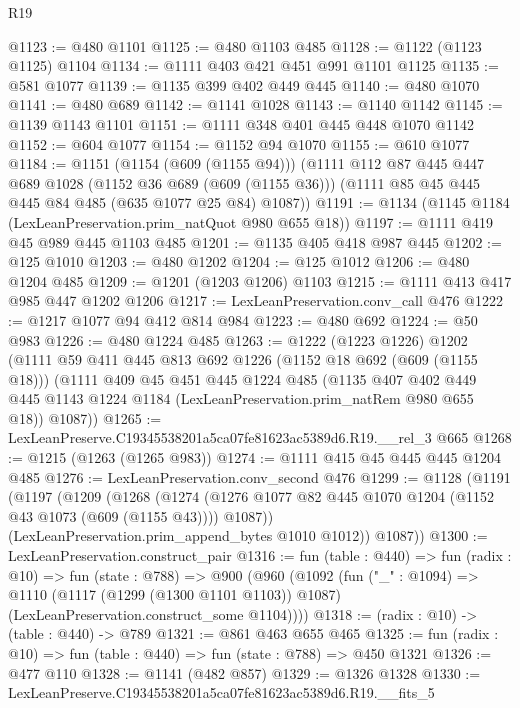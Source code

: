 \begin{lexlean}{R19}
\begin{coremodule}
@1123 := @480 @1101
@1125 := @480 @1103 @485
@1128 := @1122 (@1123 @1125) @1104
@1134 := @1111 @403 @421 @451 @991 @1101 @1125
@1135 := @581 @1077
@1139 := @1135 @399 @402 @449 @445
@1140 := @480 @1070
@1141 := @480 @689
@1142 := @1141 @1028
@1143 := @1140 @1142
@1145 := @1139 @1143 @1101
@1151 := @1111 @348 @401 @445 @448 @1070 @1142
@1152 := @604 @1077
@1154 := @1152 @94 @1070
@1155 := @610 @1077
@1184 := @1151
    (@1154 (@609 (@1155 @94)))
    (@1111
      @112
      @87
      @445
      @447
      @689
      @1028
      (@1152 @36 @689 (@609 (@1155 @36)))
      (@1111 @85 @45 @445 @445 @84 @485 (@635 @1077 @25 @84) @1087))
@1191 := @1134 (@1145 @1184 (LexLeanPreservation.prim_natQuot @980 @655 @18))
@1197 := @1111 @419 @45 @989 @445 @1103 @485
@1201 := @1135 @405 @418 @987 @445
@1202 := @125 @1010
@1203 := @480 @1202
@1204 := @125 @1012
@1206 := @480 @1204 @485
@1209 := @1201 (@1203 @1206) @1103
@1215 := @1111 @413 @417 @985 @447 @1202 @1206
@1217 := LexLeanPreservation.conv_call @476
@1222 := @1217 @1077 @94 @412 @814 @984
@1223 := @480 @692
@1224 := @50 @983
@1226 := @480 @1224 @485
@1263 := @1222
    (@1223 @1226)
    @1202
    (@1111
      @59
      @411
      @445
      @813
      @692
      @1226
      (@1152 @18 @692 (@609 (@1155 @18)))
      (@1111
        @409
        @45
        @451
        @445
        @1224
        @485
        (@1135
          @407
          @402
          @449
          @445
          @1143
          @1224
          @1184
          (LexLeanPreservation.prim_natRem @980 @655 @18))
        @1087))
@1265 := LexLeanPreserve.C19345538201a5ca07fe81623ac5389d6.R19.__rel_3 @665
@1268 := @1215 (@1263 (@1265 @983))
@1274 := @1111 @415 @45 @445 @445 @1204 @485
@1276 := LexLeanPreservation.conv_second @476
@1299 := @1128
    (@1191
      (@1197
        (@1209
          (@1268
            (@1274 (@1276 @1077 @82 @445 @1070 @1204 (@1152 @43 @1073 (@609 (@1155 @43)))) @1087))
          (LexLeanPreservation.prim_append_bytes @1010 @1012))
        @1087))
@1300 := LexLeanPreservation.construct_pair
@1316 := fun (table : @440) =>
  fun (radix : @10) =>
  fun (state : @788) =>
  @900
    (@960
      (@1092
        (fun ("_" : @1094) =>
        @1110
          (@1117 (@1299 (@1300 @1101 @1103)) @1087)
          (LexLeanPreservation.construct_some @1104))))
@1318 := (radix : @10) -> (table : @440) -> @789
@1321 := @861 @463 @655 @465
@1325 := fun (radix : @10) => fun (table : @440) => fun (state : @788) => @450 @1321
@1326 := @477 @110
@1328 := @1141 (@482 @857)
@1329 := @1326 @1328
@1330 := LexLeanPreserve.C19345538201a5ca07fe81623ac5389d6.R19.__fits_5

\end{coremodule}
\end{lexlean}
